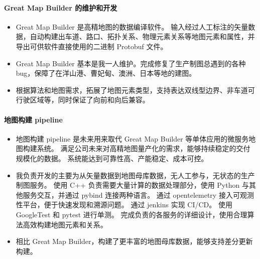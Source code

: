     \paragraph{Great Map Builder 的维护和开发}
        \begin{itemize}
            \item 
                Great Map Builder 是高精地图的数据编译软件。
                输入经过人工标注的矢量数据，自动构建出车道、路口、拓扑关系、物理元素关系等地图元素和属性，并导出可供软件直接使用的二进制 Protobuf 文件。
            \item 
                Great Map Builder 基本是我一人维护。完成修复了生产制图总遇到的各种 bug，保障了在洋山港、曹妃甸、澳洲、日本等地的建图。
            \item 
                根据算法和地图需求，拓展了地图元素类型，支持表达双线型边界、非车道可行驶区域等，同时保证了向前和向后兼容。
        \end{itemize}

    \paragraph{地图构建 pipeline}
        \begin{itemize}
            \item 
                地图构建 pipeline 是未来用来取代 Great Map Builder 等单体应用的微服务地图构建系统。
                满足公司未来对高精地图量产化的需求，能够持续稳定的交付规模化的数据。
                系统能达到可靠性高、产能稳定、成本可控。
            \item 
                我负责开发的主要为从矢量数据到地图母库数据，无人工参与，无状态的生产制图服务。
                使用 C++ 负责需要大量计算的数据处理部分，使用 Python 与其他服务交互，并通过 pybind 连接两种语言。
                通过 opentelemetry 接入可观测性平台，便于快速发现和溯源问题。
                通过 jenkins 实现 CI/CD。
                使用 GoogleTest 和 pytest 进行单测。
                完成负责的各服务的详细设计，使用合理算法高效构建地图元素和关系。
            \item 
                相比 Great Map Builder，构建了更丰富的地图母库数据，能够支持差分更新构建。
        \end{itemize}